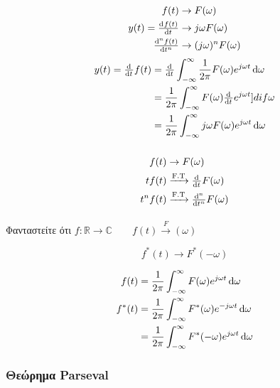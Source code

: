      \paragraph{}
     \begin{align*}
     f(t) &\to F(\omega)\\
     y(t)=\od{f(t)}{t}&\to j\omega F(\omega ) \\
     \od[n]{f(t)}{t}&\to (j\omega )^nF(\omega )
     \end{align*}
     \begin{align*}
     y(t)=\od{}{t}f(t) &= \od{}{t} \int_{-\infty}^{\infty} \frac{1}{2\pi}
     F(\omega ) e^{j\omega t}\dif \omega 
     \\ &= \frac{1}{2\pi}\int_{-\infty}^{\infty} F(\omega )\od{}{t}
     e^{j\omega t}]dif \omega 
     \\ &= \frac{1}{2\pi} \int_{-\infty}^{\infty} j\omega F(\omega )
     e^{j\omega t}\dif \omega 
     \end{align*}
     \subparagraph{}
     
     \begin{align*}
     f(t)&\to F(\omega )\\
     tf(t)&\xrightarrow{\text{F.T}}\od{}{t} F(\omega )\\
     t^nf(t)&\xrightarrow{\text{F.T}}\od[n]{}{t} F(\omega )\\
     \end{align*}
     
     \paragraph{}
     Φανταστείτε ότι \( f:\mathbb R\to\mathbb C \qquad 
     f(t) \xrightarrow F(\omega )
      \)
     
     \[
     f^*(t) \to F^*(-\omega )
     \]
     
     \begin{align*}
     f(t) &= \frac{1}{2\pi}\int_{-\infty}^{\infty} F(\omega)e^{j\omega t}\dif \omega \\
     f^*(t) &= \frac{1}{2\pi}\int_{-\infty}^{\infty} 
     F^*(\omega)e^{-j\omega t}\dif \omega \\
     &= \frac{1}{2\pi}\int_{-\infty}^{\infty}
     F^*(-\omega )e^{j\omega t}\dif \omega 
     \end{align*}
     
     \subsubsection{Θεώρημα Parseval}
     
